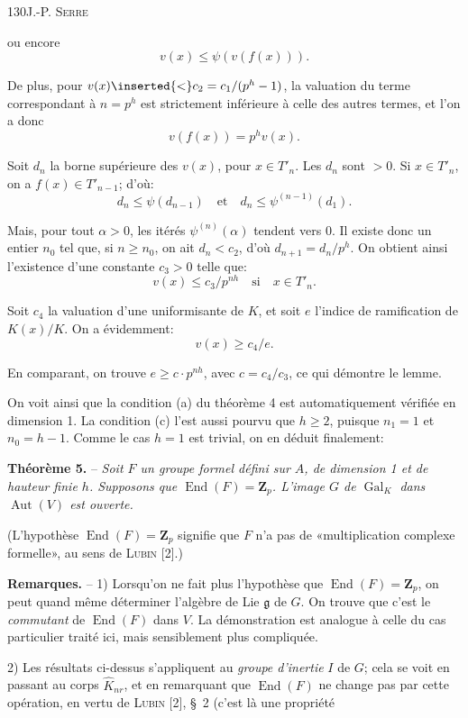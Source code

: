 130\hfill J.-P. \textsc{Serre}

ou encore
\[
v(x)\leq\psi(v(f(x))).
\]

De plus, pour $v(x)\inserted{<}c_2=c_1/(p^h-1)$, la valuation du terme correspondant à $n=p^h$ est strictement inférieure à celle des autres termes, et l'on a donc
\[
v(f(x))=p^hv(x).
\]

Soit $d_n$ la borne supérieure des $v(x)$, pour $x\in T'_n$. Les $d_n$ sont $>0$. Si $x\in T'_n$, on a $f(x)\in T'_{n-1}$; d'où:
\[
d_n\leq\psi(d_{n-1})\quad\text{et}\quad d_n\leq\psi^{(n-1)}(d_1).
\]

Mais, pour tout $\alpha>0$, les itérés $\psi^{(n)}(\alpha)$ tendent vers 0. Il existe donc un entier $n_0$ tel que, si $n\geq n_0$, on ait $d_n<c_2$, d'où $d_{n+1}=d_n/p^h$. On obtient ainsi l'existence d'une constante $c_3>0$ telle que:
\[
v(x)\leq c_3/p^{nh}\quad\text{si}\quad x\in T'_n.
\]

Soit $c_4$ la valuation d'une uniformisante de $K$, et soit $e$ l'indice de ramification de $K(x)/K$. On a évidemment:
\[
v(x)\geq c_4/e.
\]

En comparant, on trouve $e\geq c\cdot p^{nh}$, avec $c=c_4/c_3$, ce qui démontre le lemme.

On voit ainsi que la condition (a) du théorème 4 est automatiquement vérifiée en dimension 1. La condition (c) l'est aussi pourvu que $h\geq2$, puisque $n_1=1$ et $n_0=h-1$. Comme le cas $h=1$ est trivial, on en déduit finalement:

\textbf{Théorème 5.} -- \textit{Soit $F$ un groupe formel défini sur $A$, de dimension 1 et de hauteur finie $h$. Supposons que $\operatorname{End}(F)=\mathbf Z_p$. L'image $G$ de $\operatorname{Gal}_K$ dans $\operatorname{Aut}(V)$ est ouverte.}

(L'hypothèse $\operatorname{End}(F)=\mathbf Z_p$ signifie que $F$ n'a pas de «multiplication complexe formelle», au sens de \textsc{Lubin} [2].)

\textbf{Remarques.} -- 1) Lorsqu'on ne fait plus l'hypothèse que $\operatorname{End}(F)=\mathbf Z_p$, on peut quand même déterminer l'algèbre de Lie $\mathfrak g$ de $G$. On trouve que c'est le \textit{commutant} de $\operatorname{End}(F)$ dans $V$. La démonstration est analogue à celle du cas particulier traité ici, mais sensiblement plus compliquée.

2) Les résultats ci-dessus s'appliquent au \textit{groupe d'inertie} $I$ de $G$; cela se voit en passant au corps $\widehat K_{nr}$, et en remarquant que $\operatorname{End}(F)$ ne change pas par cette opération, en vertu de \textsc{Lubin} [2], \S\ 2 (c'est là une propriété
